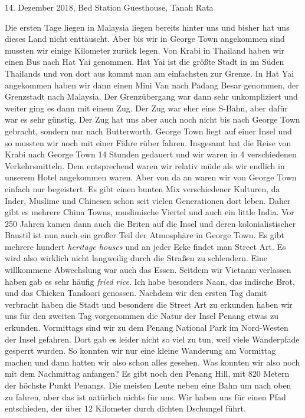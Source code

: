 \documentclass[11pt]{book}
\begin{document}
14. Dezember 2018, Bed Station Guesthouse, Tanah Rata

Die ersten Tage liegen in Malaysia liegen bereits hinter uns und bisher hat uns dieses Land nicht enttäuscht. Aber bis wir in 
George Town angekommen sind mussten wir einige Kilometer zurück legen. Von Krabi in Thailand haben wir einen Bus nach Hat Yai 
genommen. Hat Yai ist die größte Stadt in im Süden Thailands und von dort aus kommt man am einfachsten zur Grenze. In Hat Yai 
angekommen haben wir dann einen Mini Van nach Padang Besar genommen, der Grenzstadt nach Malaysia. Der Grenzübergang war dann 
sehr unkompliziert und weiter ging es dann mit einem Zug. Der Zug war eher eine S-Bahn, aber dafür war es sehr günstig. Der Zug 
hat uns aber auch noch nicht bis nach George Town gebracht, sondern nur nach Butterworth. George Town liegt auf einer Insel und so 
mussten wir noch mit einer Fähre rüber fahren. Insgesamt hat die Reise von Krabi nach George Town 14 Stunden gedauert und wir waren 
in 4 verschiedenen Verkehrsmitteln. Dem entsprechend waren wir relativ müde als wir endlich in unserem Hotel angekommen waren. 
Aber von da an waren wir von George Town einfach nur begeistert. Es gibt einen bunten Mix verschiedener Kulturen, da Inder, Muslime 
und Chinesen schon seit vielen Generationen dort leben. Daher gibt es mehrere China Towns, muslimische Viertel und auch ein little 
India. Vor 250 Jahren kamen dann auch die Briten auf die Insel und deren kolonialistischer Baustil ist nun auch ein großer Teil 
der Atmosphäre in George Town. Es gibt mehrere hundert \emph{heritage houses} und an jeder Ecke findet man Street Art. Es wird 
also wirklich nicht langweilig durch die Straßen zu schlendern. Eine willkommene Abwechslung war auch das Essen. Seitdem wir Vietnam 
verlassen haben gab es sehr häufig \emph{fried rice}. Ich habe besonders Naan, das indische Brot, und das Chicken Tandoori genossen.
Nachdem wir den ersten Tag damit verbracht haben die Stadt und besonders die Street Art zu erkunden haben wir uns für den zweiten 
Tag vorgenommen die Natur der Insel Penang etwas zu erkunden. Vormittags sind wir zu dem Penang National Park im Nord-Westen der 
Insel gefahren. Dort gab es leider nicht so viel zu tun, weil viele Wanderpfade gesperrt wurden. So konnten wir nur eine kleine 
Wanderung am Vormittag machen und dann hatten wir also schon alles gesehen. Was konnten wir also noch mit dem Nachmittag anfangen?
Es gibt noch den Penang Hill, mit 820 Metern der höchste Punkt Penangs. Die meisten Leute neben eine Bahn um nach oben zu fahren, 
aber das ist natürlich nichts für uns. Wir haben uns für einen Pfad entschieden, der über 12 Kilometer durch dichten Dschungel führt.
\end{document}
